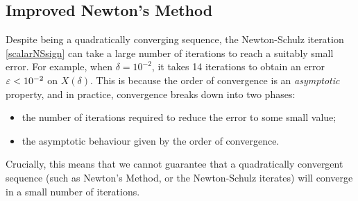 





\subsection{Improved Newton's Method}\label{improvednewtonsection}

Despite being a quadratically converging sequence, the Newton-Schulz iteration \eqref{scalarNSsign} can take a large number of iterations to reach a suitably small error. For example, when $\delta=10^{-2}$, it takes 14 iterations to obtain an error $\varepsilon<10^{-2}$ on $X(\delta)$. This is because the order of convergence is an \textit{asymptotic} property, and in practice, convergence breaks down into two phases:
\begin{itemize}
    \item the number of iterations required to reduce the error to some small value;
    \item the asymptotic behaviour given by the order of convergence.
\end{itemize}
Crucially, this means that we cannot guarantee that a quadratically convergent sequence (such as Newton's Method, or the Newton-Schulz iterates) will converge in a small number of iterations. 


